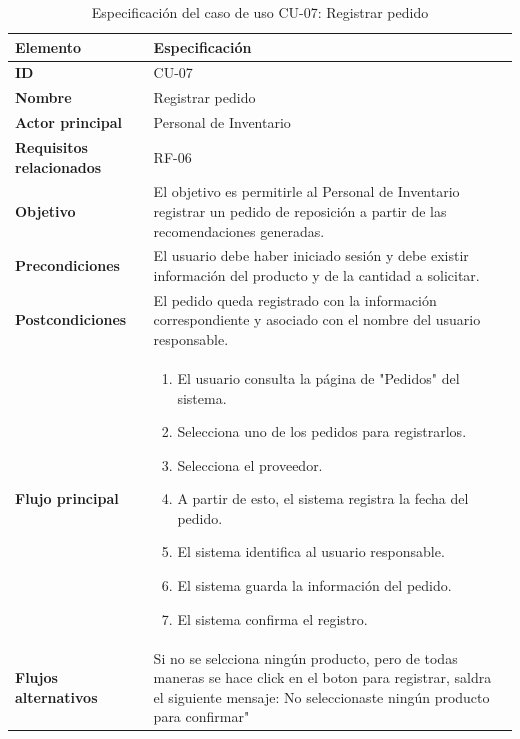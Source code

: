\begin{table}[H]
\centering
\caption{Especificación del caso de uso CU-07: Registrar pedido}
\label{tab:cu07_registrar_pedido}
\renewcommand{\arraystretch}{1.3}
\begin{tabularx}{\textwidth}{|>{\bfseries}p{3.5cm}|X|}
\hline
Elemento & Especificación \\
\hline
ID & CU-07 \\
\hline
Nombre & Registrar pedido \\
\hline
Actor principal & Personal de Inventario \\
\hline
Requisitos relacionados & RF-06 \\
\hline
Objetivo & El objetivo es permitirle al Personal de Inventario registrar un pedido de reposición a partir de las recomendaciones generadas. \\
\hline
Precondiciones & El usuario debe haber iniciado sesión y debe existir información del producto y de la cantidad a solicitar. \\
\hline
Postcondiciones & El pedido queda registrado con la información correspondiente y asociado con el nombre del usuario responsable. \\
\hline
Flujo principal &
\begin{enumerate}
    \item El usuario consulta la página de "Pedidos" del sistema.
    \item Selecciona uno de los pedidos para registrarlos.
    \item Selecciona el proveedor.
    \item A partir de esto, el sistema registra la fecha del pedido.
    \item El sistema identifica al usuario responsable.
    \item El sistema guarda la información del pedido.
    \item El sistema confirma el registro.
\end{enumerate} \\
\hline
Flujos alternativos & Si no se selcciona ningún producto, pero de todas maneras se hace click en el boton para registrar, saldra el siguiente mensaje: No seleccionaste ningún producto para confirmar" \\
\hline
\end{tabularx}
\end{table}

